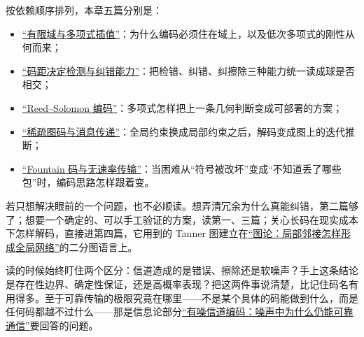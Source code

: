 按依赖顺序排列，本章五篇分别是：

\begin{itemize}
\tightlist
\item \hyperref[sec:04-Discrete-Mathematics/05-Coding-and-Polynomial-Methods/01]{``有限域与多项式插值''}：为什么编码必须住在域上，以及低次多项式的刚性从何而来；
\item \hyperref[sec:04-Discrete-Mathematics/05-Coding-and-Polynomial-Methods/02]{``码距决定检测与纠错能力''}：把检错、纠错、纠擦除三种能力统一读成球是否相交；
\item \hyperref[sec:04-Discrete-Mathematics/05-Coding-and-Polynomial-Methods/03]{``Reed--Solomon 编码''}：多项式怎样把上一条几何判断变成可部署的方案；
\item \hyperref[sec:04-Discrete-Mathematics/05-Coding-and-Polynomial-Methods/04]{``稀疏图码与消息传递''}：全局约束换成局部约束之后，解码变成图上的迭代推断；
\item \hyperref[sec:04-Discrete-Mathematics/05-Coding-and-Polynomial-Methods/05]{``Fountain 码与无速率传输''}：当困难从``符号被改坏''变成``不知道丢了哪些包''时，编码思路怎样跟着变。
\end{itemize}

若只想解决眼前的一个问题，也不必顺读。想弄清冗余为什么真能纠错，第二篇够了；想要一个确定的、可以手工验证的方案，读第一、三篇；关心长码在现实成本下怎样解码，直接进第四篇，它用到的 Tanner 图建立在\hyperref[ch:028]{``图论：局部邻接怎样形成全局网络''}的二分图语言上。

读的时候始终盯住两个区分：信道造成的是错误、擦除还是软噪声？手上这条结论是存在性边界、确定性保证，还是高概率表现？把这两件事说清楚，比记住码名有用得多。至于可靠传输的极限究竟在哪里——不是某个具体的码能做到什么，而是任何码都越不过什么——那是信息论部分\hyperref[ch:058]{``有噪信道编码：噪声中为什么仍能可靠通信''}要回答的问题。
